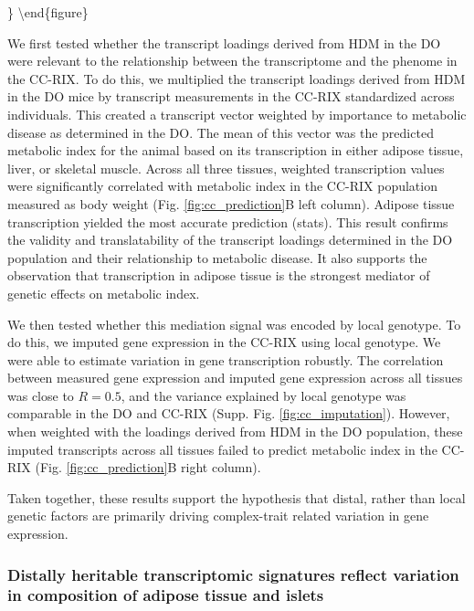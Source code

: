 \documentclass[
]{article}
\begin{document}
\} \label{fig:cc_prediction} \textbackslash end\{figure\}

We first tested whether the transcript loadings derived from HDM in the
DO were relevant to the relationship between the transcriptome and the
phenome in the CC-RIX. To do this, we multiplied the transcript loadings
derived from HDM in the DO mice by transcript measurements in the CC-RIX
standardized across individuals. This created a transcript vector
weighted by importance to metabolic disease as determined in the DO. The
mean of this vector was the predicted metabolic index for the animal
based on its transcription in either adipose tissue, liver, or skeletal
muscle. Across all three tissues, weighted transcription values were
significantly correlated with metabolic index in the CC-RIX population
measured as body weight (Fig. \ref{fig:cc_prediction}B left column).
Adipose tissue transcription yielded the most accurate prediction
(stats). This result confirms the validity and translatability of the
transcript loadings determined in the DO population and their
relationship to metabolic disease. It also supports the observation that
transcription in adipose tissue is the strongest mediator of genetic
effects on metabolic index.

We then tested whether this mediation signal was encoded by local
genotype. To do this, we imputed gene expression in the CC-RIX using
local genotype. We were able to estimate variation in gene transcription
robustly. The correlation between measured gene expression and imputed
gene expression across all tissues was close to \(R = 0.5\), and the
variance explained by local genotype was comparable in the DO and CC-RIX
(Supp. Fig. \ref{fig:cc_imputation}). However, when weighted with the
loadings derived from HDM in the DO population, these imputed
transcripts across all tissues failed to predict metabolic index in the
CC-RIX (Fig. \ref{fig:cc_prediction}B right column).

Taken together, these results support the hypothesis that distal, rather
than local genetic factors are primarily driving complex-trait related
variation in gene expression.

\subsubsection{Distally heritable transcriptomic signatures reflect
variation in composition of adipose tissue and
islets}\label{distally-heritable-transcriptomic-signatures-reflect-variation-in-composition-of-adipose-tissue-and-islets}
\end{document}
